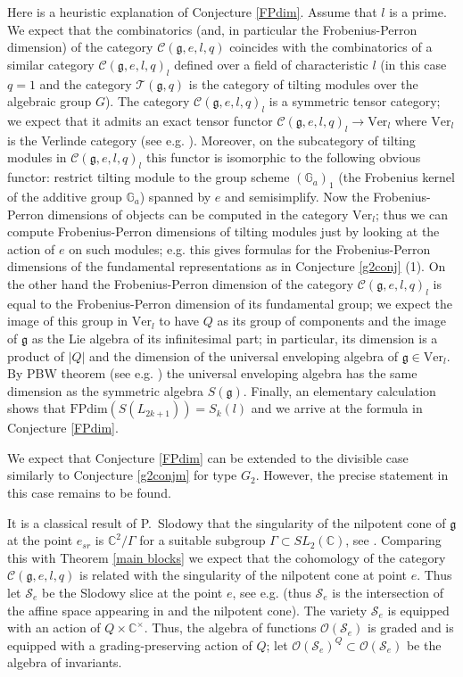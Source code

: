\documentclass{amsart}
\theoremstyle{definition}
\newcommand{\G}{\mathbb{G}}
\newcommand{\C}{\mathcal{C}}
\newcommand{\Sl}{\mathcal{S}}
\newcommand{\BC}{\mathbb{C}}
\newcommand{\g}{\mathfrak{g}}
\newcommand{\T}{\mathcal{T}}
\newcommand{\mO}{\mathcal{O}}
\newcommand{\FP}{\text{FPdim}}
\numberwithin{equation}{section}
\begin{document}
Here is a heuristic explanation of Conjecture \ref{FPdim}. Assume that $l$ is a prime.
We expect that the combinatorics (and, in particular the Frobenius-Perron dimension) of the category $\C(\g,e,l,q)$ coincides with the combinatorics of a similar category $\C(\g,e,l,q)_l$
defined over a field of characteristic $l$ (in this case $q=1$ and the category $\T(\g,q)$
is the category of tilting modules over the algebraic group $G$). The category
$\C(\g,e,l,q)_l$ is a symmetric tensor category; we expect that it admits 
an exact tensor functor $\C(\g,e,l,q)_l\to \mbox{Ver}_l$ where $\mbox{Ver}_l$
is the Verlinde category (see e.g. \cite{BEO}). Moreover, on the subcategory of
tilting modules in $\C(\g,e,l,q)_l$ this functor is isomorphic to the following
obvious functor: restrict tilting module to the group scheme $(\G_a)_1$ (the Frobenius 
kernel of the additive group $\G_a$) spanned by $e$ and semisimplify. Now the
Frobenius-Perron dimensions of objects can be computed in the category $\mbox{Ver}_l$;
thus we can compute Frobenius-Perron dimensions of tilting modules just by
looking at the action of $e$ on such modules; e.g. this gives formulas for the Frobenius-Perron dimensions of the fundamental representations as in Conjecture \ref{g2conj} (1). On the other hand the Frobenius-Perron dimension of the
category $\C(\g,e,l,q)_l$ is equal to the Frobenius-Perron dimension of its
fundamental group; we expect the image of this group in $\mbox{Ver}_l$ to have $Q$
as its group of components and the image of $\g$ as the Lie algebra of its
infinitesimal part; in particular, its dimension is a product of $|Q|$ and the
dimension of the universal enveloping algebra of $\g \in \mbox{Ver}_l$. By
PBW theorem (see e.g. \cite{Epbw}) the universal enveloping algebra has the same
dimension as the symmetric algebra $S(\g)$. Finally, an elementary calculation 
shows that $\FP(S(L_{2k+1}))=S_k(l)$ and we arrive at the formula in Conjecture \ref{FPdim}.

We expect that Conjecture \ref{FPdim} can be extended to the divisible case
similarly to Conjecture \ref{g2conjm} for type $G_2$. However, the precise
statement in this case remains to be found.

It is a classical result of P.~Slodowy that the singularity of the nilpotent
cone of $\g$ at the point $e_{sr}$ is $\BC^2/\Gamma$ for a suitable subgroup
$\Gamma \subset SL_2(\BC)$, see \cite{Sl}. Comparing this with Theorem \ref{main blocks}
we expect that the cohomology of the category $\C(\g,e,l,q)$ is related
with the singularity of the nilpotent cone at point $e$. Thus let $\Sl_e$
be the Slodowy slice at the point $e$, see e.g. \cite{GG} (thus $\Sl_e$ is the intersection
of the affine space appearing in \cite[1.1]{GG} and the nilpotent cone). The variety $\Sl_e$
is equipped with an action of $Q\times \BC^\times$. Thus, the algebra of functions
$\mO(\Sl_e)$ is graded and is equipped with a grading-preserving action of $Q$;
let $\mO(\Sl_e)^Q\subset \mO(\Sl_e)$ be the algebra of invariants.
\end{document}
